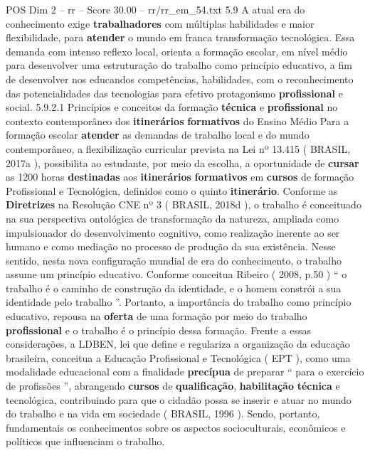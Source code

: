 \begin{textsample}{POS Dim 2 – rr – Score 30.00 – rr/rr\_em\_54.txt}  \label{ex:f2_pos_107}
5.9 A atual era do conhecimento exige \textbf{trabalhadores} com múltiplas habilidades e maior flexibilidade, para \textbf{atender} o mundo em franca transformação tecnológica.
Essa demanda com intenso reflexo local, orienta a formação escolar, em nível médio para desenvolver uma estruturação do trabalho como princípio educativo, a fim de desenvolver nos educandos competências, habilidades, com o reconhecimento das potencialidades das tecnologias para efetivo protagonismo \textbf{profissional} e social. 5.9.2.1 Princípios e conceitos da formação \textbf{técnica} e \textbf{profissional} no contexto contemporâneo dos \textbf{itinerários} \textbf{formativos} do Ensino Médio Para a formação escolar \textbf{atender} as demandas de trabalho local e do mundo contemporâneo, a flexibilização curricular prevista na Lei nº 13.415 ( BRASIL, 2017a ), possibilita ao estudante, por meio da escolha, a oportunidade de \textbf{cursar} as 1200 horas \textbf{destinadas} aos \textbf{itinerários} \textbf{formativos} em \textbf{cursos} de formação Profissional e Tecnológica, definidos como o quinto \textbf{itinerário}.
Conforme as \textbf{Diretrizes} na Resolução CNE nº 3 ( BRASIL, 2018d ), o trabalho é conceituado na sua perspectiva ontológica de transformação da natureza, ampliada como impulsionador do desenvolvimento cognitivo, como realização inerente ao ser humano e como mediação no processo de produção da sua existência.
Nesse sentido, nesta nova configuração mundial de era do conhecimento, o trabalho assume um princípio educativo.
Conforme conceitua Ribeiro ( 2008, p.50 ) “ o trabalho é o caminho de construção da identidade, e o homem constrói a sua identidade pelo trabalho ”.
Portanto, a importância do trabalho como princípio educativo, repousa na \textbf{oferta} de uma formação por meio do trabalho \textbf{profissional} e o trabalho é o princípio dessa formação.
Frente a essas considerações, a LDBEN, lei que define e regulariza a organização da educação brasileira, conceitua a Educação Profissional e Tecnológica ( EPT ), como uma modalidade educacional com a finalidade \textbf{precípua} de preparar “ para o exercício de profissões ”, abrangendo \textbf{cursos} de \textbf{qualificação}, \textbf{habilitação} \textbf{técnica} e tecnológica, contribuindo para que o cidadão possa se inserir e atuar no mundo do trabalho e na vida em sociedade ( BRASIL, 1996 ).
Sendo, portanto, fundamentais os conhecimentos sobre os aspectos socioculturais, econômicos e políticos que influenciam o trabalho.

\end{textsample}
